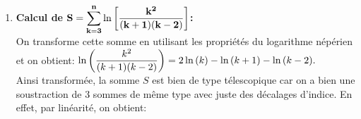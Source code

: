 \documentclass[a4paper, 11pt,reqno]{article}
\begin{document}
\begin{correction}
\begin{enumerate}
\item \textbf{Calcul de $\mathbf{S=\displaystyle \sum\limits_{k=3}^{n} \ln{\left\lbrack  \displaystyle\frac{k^2}{(k+1)(k-2)} \right\rbrack}}$:}\\ 
On transforme cette somme en utilisant les propri\'et\'es du logarithme n\'ep\'erien et on obtient: $\ln{\left(  \displaystyle\frac{k^2}{(k+1)(k-2)}\right)}=2\ln{(k)}-\ln{(k+1)}-\ln{(k-2)}.$\\
Ainsi transform\'ee, la somme $S$ est bien de type t\'elescopique car on a bien une soustraction de 3 sommes de m\^{e}me type avec juste des d\'ecalages d'indice. En effet, par lin\'earit\'e, on obtient:

\end{enumerate}
\end{correction}
\end{document}
